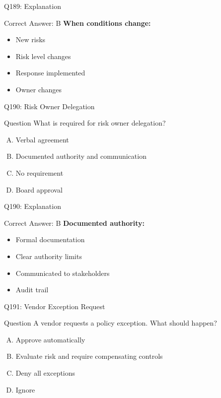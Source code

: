 \documentclass{beamer}
\begin{document}
	\begin{frame}{Q189: Explanation}
		\begin{block}{Correct Answer: B}
			\textbf{When conditions change:}
			\begin{itemize}
				\item New risks
				\item Risk level changes
				\item Response implemented
				\item Owner changes
			\end{itemize}
		\end{block}
	\end{frame}
	
	\begin{frame}{Q190: Risk Owner Delegation}
		\begin{block}{Question}
			What is required for risk owner delegation?
		\end{block}
		\begin{enumerate}[(A)]
			\item Verbal agreement
			\item Documented authority and communication
			\item No requirement
			\item Board approval
		\end{enumerate}
	\end{frame}
	
	\begin{frame}{Q190: Explanation}
		\begin{block}{Correct Answer: B}
			\textbf{Documented authority:}
			\begin{itemize}
				\item Formal documentation
				\item Clear authority limits
				\item Communicated to stakeholders
				\item Audit trail
			\end{itemize}
		\end{block}
	\end{frame}
	
	\begin{frame}{Q191: Vendor Exception Request}
		\begin{block}{Question}
			A vendor requests a policy exception. What should happen?
		\end{block}
		\begin{enumerate}[(A)]
			\item Approve automatically
			\item Evaluate risk and require compensating controls
			\item Deny all exceptions
			\item Ignore
		\end{enumerate}
	\end{frame}
	
\end{document}
